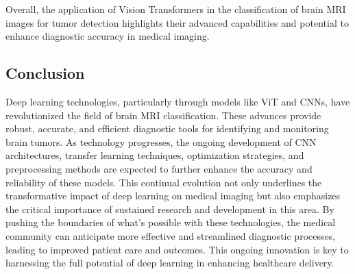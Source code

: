 Overall, the application of Vision Transformers in the classification of brain MRI images for tumor detection highlights their advanced capabilities and potential to enhance diagnostic accuracy in medical imaging.


\subsection{Conclusion}


Deep learning technologies, particularly through models like ViT and CNNs, have revolutionized the field of brain MRI classification. These advances provide robust, accurate, and efficient diagnostic tools for identifying and monitoring brain tumors. As technology progresses, the ongoing development of CNN architectures, transfer learning techniques, optimization strategies, and preprocessing methods are expected to further enhance the accuracy and reliability of these models. This continual evolution not only underlines the transformative impact of deep learning on medical imaging but also emphasizes the critical importance of sustained research and development in this area. By pushing the boundaries of what's possible with these technologies, the medical community can anticipate more effective and streamlined diagnostic processes, leading to improved patient care and outcomes. This ongoing innovation is key to harnessing the full potential of deep learning in enhancing healthcare delivery.
